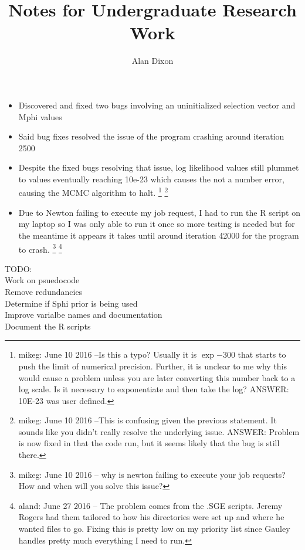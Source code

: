 \documentclass[11pt]{labbook}
\title{Notes for Undergraduate Research Work}
\author{Alan Dixon}
\begin{document}

\begin{itemize}
    \item Discovered and fixed two bugs involving an uninitialized selection vector and Mphi values
    \item Said bug fixes resolved the issue of the program crashing around iteration 2500
      
    \item Despite the fixed bugs resolving that issue, log likelihood values still plummet to values eventually reaching 10e-23 which causes the not a number error, causing the MCMC algorithm to halt.
\footnote{mikeg: June 10 2016 --Is this a typo?  Usually it is $\exp{-300}$ that starts to push the limit of numerical precision.
Further, it is unclear to me why this would cause a problem unless you are later converting this number back to a log scale.  
Is it necessary to exponentiate and then take the log?
ANSWER: 10E-23 was user defined.
}
\footnote{mikeg: June 10 2016 --This is confusing given the previous statement. 
  It sounds like you didn't really resolve the underlying issue.
  ANSWER: Problem is now fixed in that the code run, but it seems likely that the bug is still there.}
    \item Due to Newton failing to execute my job request, I had to run the R script on my laptop so I was only able to run it once so more testing is needed but for the meantime it appears it takes until around iteration 42000 for the program to crash.
      \footnote{mikeg: June 10 2016 -- why is newton failing to execute your job requests? 
        How and when will you solve this issue?}
      \footnote{aland: June 27 2016 -- The problem comes from the .SGE scripts. Jeremy Rogers had them tailored to how his directories were set up and where he wanted files to go. Fixing this is pretty low on my priority list since Gauley handles pretty much everything I need to run.}
    \end{itemize}

TODO:\\
    Work on psuedocode\\
    Remove redundancies\\
    Determine if Sphi prior is being used\\
    Improve varialbe names and documentation\\
    Document the R scripts\\
    
\end{document}
